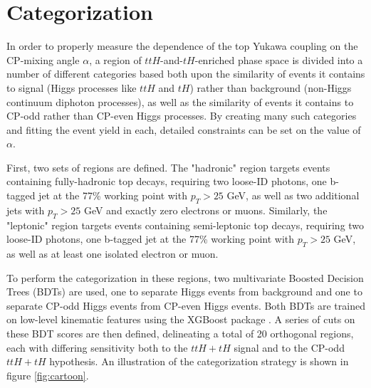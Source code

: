 \section{Categorization} \label{sec:ttHCPCategorization}

In order to properly measure the dependence of the top Yukawa coupling on the CP-mixing angle $\alpha$, a region of $ttH$-and-$tH$-enriched phase space  is divided into a number of different categories based both upon the similarity of events it contains to signal (Higgs processes like $ttH$ and $tH$) rather than background (non-Higgs continuum diphoton processes), as well as the similarity of events it contains to CP-odd rather than CP-even Higgs processes. By creating many such categories and fitting the event yield in each, detailed constraints can be set on the value of $\alpha$.

First, two sets of regions are defined. The "hadronic" region targets events containing fully-hadronic top decays, requiring two loose-ID photons, one b-tagged jet at the 77\% working point with $p_{T} > 25$ GeV, as well as two additional jets with $p_{T} > 25$ GeV and exactly zero electrons or muons. Similarly, the "leptonic" region targets events containing semi-leptonic top decays, requiring two loose-ID photons, one b-tagged jet at the 77\% working point with $p_{T} > 25$ GeV, as well as at least one isolated electron or muon.

To perform the categorization in these regions, two multivariate Boosted Decision Trees (BDTs) are used, one to separate Higgs events from background and one to separate CP-odd Higgs events from CP-even Higgs events. Both BDTs are trained on low-level kinematic features using the XGBoost package \cite{XGBoost}. A series of cuts on these BDT scores are then defined, delineating a total of 20 orthogonal regions, each with differing sensitivity both to the $ttH+tH$ signal and to the CP-odd $ttH+tH$ hypothesis. An illustration of the categorization strategy is shown in figure \ref{fig:cartoon}.

